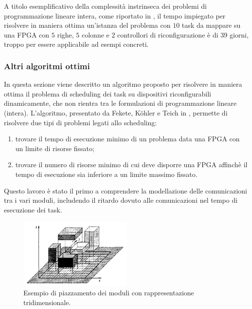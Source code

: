 A titolo esemplificativo della complessità instrinseca dei problemi di programmazione
lineare intera, come riportato in \cite{Redaelli2DILP}, il tempo impiegato per risolvere in 
maniera ottima un'istanza del problema con $10$ task da mappare su una 
\ac{FPGA} con $5$ righe, $5$ colonne e $2$ controllori di riconfigurazione è di 
$39$ giorni, troppo per essere applicabile ad esempi concreti.


\subsubsection{Altri algoritmi ottimi}
In questa sezione viene descritto un algoritmo proposto per risolvere in 
maniera ottima il problema di scheduling dei task su dispositivi 
riconfigurabili dinamicamente, che non rientra tra le formulazioni di 
programmazione lineare (intera). L'algoritmo, presentato da Fekete, K\"ohler 
e Teich in \cite{FeketeOptimal}, permette di risolvere due tipi di problemi 
legati allo scheduling:
\begin{enumerate}
 \item trovare il tempo di esecuzione minimo di un problema data una \ac{FPGA} 
con un limite di risorse fissato;
 \item trovare il numero di risorse minimo di cui deve disporre una \ac{FPGA} 
affinchè il tempo di esecuzione sia inferiore a un limite massimo fissato.
\end{enumerate}

Questo lavoro è stato il primo a comprendere la modellazione delle 
comunicazioni tra i vari moduli, includendo il ritardo dovuto alle 
comunicazioni nel tempo di esecuzione dei task.

\begin{figure}[!tb]
 \begin{center}
  \includegraphics[width=0.5\textwidth]
{capitoli/figure/cap3/BoxModules.pdf}
\caption[Piazzamento dei moduli con rappresentazione tridimensionale]{Esempio 
di piazzamento dei moduli con rappresentazione tridimensionale.\footnotemark}
\label{fig:boxModules}
 \end{center}
\end{figure}

